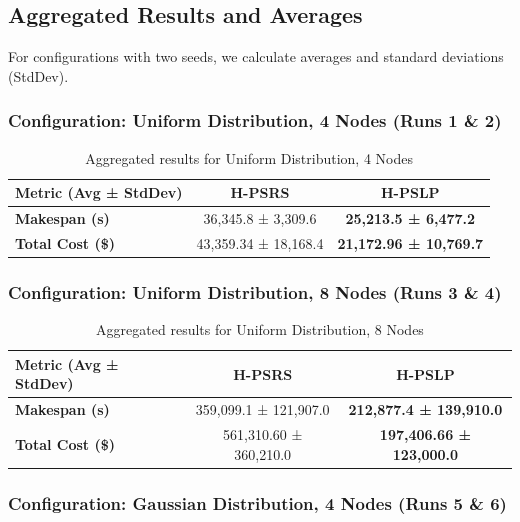 \documentclass[]{interact}
\theoremstyle{plain}
\theoremstyle{definition}
\theoremstyle{remark}
\begin{document}
\subsection{Aggregated Results and Averages}

For configurations with two seeds, we calculate averages and standard deviations (StdDev).

\subsubsection{Configuration: Uniform Distribution, 4 Nodes (Runs 1 \& 2)}

\begin{table}[H]
\centering
\caption{Aggregated results for Uniform Distribution, 4 Nodes}
\label{tab:agg_uniform_4}
\begin{tabular}{@{}lcc@{}}
\toprule
\textbf{Metric (Avg ± StdDev)} & \textbf{H-PSRS} & \textbf{H-PSLP} \\
\midrule
\textbf{Makespan (\textmu{}s)} & 36,345.8 ± 3,309.6 & \textbf{25,213.5 ± 6,477.2} \\
\textbf{Total Cost (\$)} & 43,359.34 ± 18,168.4 & \textbf{21,172.96 ± 10,769.7} \\
\bottomrule
\end{tabular}
\end{table}

\subsubsection{Configuration: Uniform Distribution, 8 Nodes (Runs 3 \& 4)}

\begin{table}[H]
\centering
\caption{Aggregated results for Uniform Distribution, 8 Nodes}
\label{tab:agg_uniform_8}
\begin{tabular}{@{}lcc@{}}
\toprule
\textbf{Metric (Avg ± StdDev)} & \textbf{H-PSRS} & \textbf{H-PSLP} \\
\midrule
\textbf{Makespan (\textmu{}s)} & 359,099.1 ± 121,907.0 & \textbf{212,877.4 ± 139,910.0} \\
\textbf{Total Cost (\$)} & 561,310.60 ± 360,210.0 & \textbf{197,406.66 ± 123,000.0} \\
\bottomrule
\end{tabular}
\end{table}

\subsubsection{Configuration: Gaussian Distribution, 4 Nodes (Runs 5 \& 6)}
\end{document}
